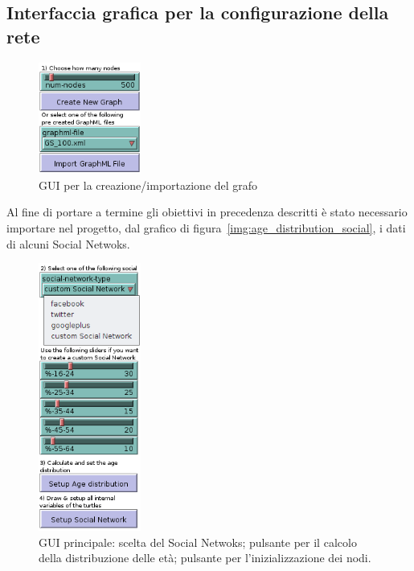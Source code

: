 \subsection{Interfaccia grafica per la configurazione della rete}
\label{section:gui_setup_graph}
\vspace{3 mm}

\begin{figure}
  \vspace{-40pt}
  \begin{center}
    \includegraphics[width=0.30\textwidth]{img/gui-graph.png}
  \end{center}
 \vspace{-10pt}
 \caption{GUI per la creazione/importazione del grafo}
 \vspace{-10pt}
 \label{img:gui_graph}
\end{figure}
Al fine di portare a termine gli obiettivi in precedenza descritti è stato necessario importare nel progetto, 
dal grafico di figura~\ref{img:age_distribution_social}, i dati di alcuni Social Netwoks.


\begin{figure}
  \vspace{-20pt}
  \begin{center}
    \includegraphics[width=0.30\textwidth]{img/gui-main.png}
  \end{center}
 \vspace{-10pt}
 \caption{GUI principale: 
 scelta del Social Netwoks;
 pulsante per il calcolo della distribuzione delle età;
 pulsante per l'inizializzazione dei nodi.}
 \vspace{-10pt}
 \label{img:gui_main}
\end{figure}

